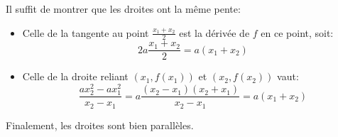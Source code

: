 Il suffit de montrer que les droites ont la même pente:
\begin{itemize}
  \item Celle de la tangente au point $\frac{x_1+x_2}{2}$ est la dérivée de $f$ en ce point, soit: \[ 2a\frac{x_1+x_2}{2}=a(x_1+x_2) \]
  \item Celle de la droite reliant $(x_1, f(x_1))$ et $(x_2,f(x_2))$ vaut: 
  \[ \frac{ax_2^2-ax_1^2}{x_2-x_1}=a\frac{(x_2-x_1)(x_2+x_1)}{x_2-x_1} = a(x_1+x_2) \]
\end{itemize}
Finalement, les droites sont bien parallèles.
